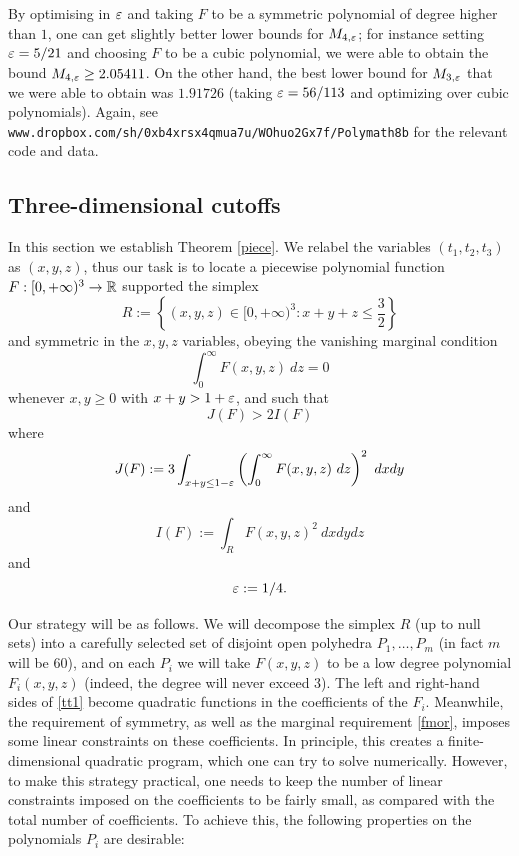 \begin{remark} By optimising in $\varepsilon$ and taking $F$ to be a symmetric polynomial of degree higher than $1$, one can get slightly better lower bounds for $M_{4,\varepsilon}$; for instance setting $\varepsilon = 5/21$ and choosing $F$ to be a cubic polynomial, we were able to obtain the bound $M_{4,\varepsilon} \geq 2.05411$.  On the other hand, the best lower bound for $M_{3,\varepsilon}$ that we were able to obtain was $1.91726$ (taking $\varepsilon = 56/113$ and optimizing over cubic polynomials).  Again, see {\tt www.dropbox.com/sh/0xb4xrsx4qmua7u/WOhuo2Gx7f/Polymath8b} for the relevant code and data.
\end{remark}

\subsection{Three-dimensional cutoffs}\label{3d}

In this section we establish Theorem \ref{piece}.  We relabel the variables $(t_1,t_2,t_3)$ as $(x,y,z)$, thus our task is to locate a piecewise polynomial function
$F: [0,+\infty)^3 \to \mathbb{R}$ supported the simplex
$$ R := \left\{ (x,y,z) \in [0,+\infty)^3: x+y+z \leq \frac{3}{2}\right\}$$
and symmetric in the $x,y,z$ variables, obeying the vanishing marginal condition
\begin{equation}\label{fmor}
\int_0^\infty F(x,y,z)\ dz = 0
\end{equation}
whenever $x,y \geq 0$ with $x+y > 1+\varepsilon$, and such that
\begin{equation}\label{tt1}
J(F) > 2 I(F)
\end{equation}
where
\begin{equation}\label{jf-def}
J(F) := 3\int_{x+y \leq 1-\eps} \left(\int_0^\infty F(x,y,z)\ dz\right)^2\ dx dy
\end{equation}
and
\begin{equation}\label{if-def}
I(F) := \int_R  F(x,y,z)^2\ dx dy dz
\end{equation}
and
$$\varepsilon := 1/4.$$

Our strategy will be as follows.  We will decompose the simplex $R$ (up to null sets) into a carefully selected set of disjoint open polyhedra $P_1,\dots,P_m$ (in fact $m$ will be $60$), and on each $P_i$ we will take $F(x,y,z)$ to be a low degree polynomial $F_i(x,y,z)$ (indeed, the degree will never exceed $3$).  The left and right-hand sides of \eqref{tt1} become quadratic functions in the coefficients of the $F_i$.  Meanwhile, the requirement of symmetry, as well as the marginal requirement \eqref{fmor}, imposes some linear constraints on these coefficients.  In principle, this creates a finite-dimensional quadratic program, which one can try to solve numerically.  However, to make this strategy practical, one needs to keep the number of linear constraints imposed on the coefficients to be fairly small, as compared with the total number of coefficients.  To achieve this, the following properties on the polynomials $P_i$ are desirable:

